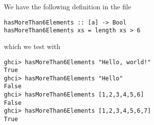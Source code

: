 
We have the following definition in the file 
\begin{verbatim}
hasMoreThan6Elements :: [a] -> Bool
hasMoreThan6Elements xs = length xs > 6
\end{verbatim}
which we test with
\begin{verbatim}
ghci> hasMoreThan6Elements "Hello, world!"
True
ghci> hasMoreThan6Elements "Hello"
False
ghci> hasMoreThan6Elements [1,2,3,4,5,6]
False
ghci> hasMoreThan6Elements [1,2,3,4,5,6,7]
True
\end{verbatim}
